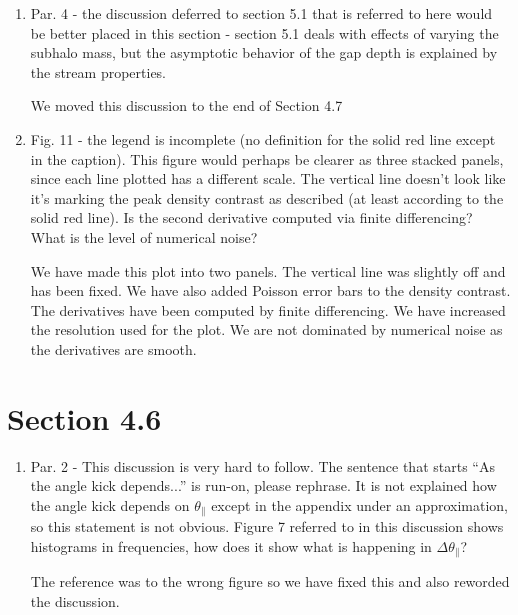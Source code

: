 \documentclass{article}
\begin{document}
\begin{enumerate}
\item Par. 4 - the discussion deferred to section 5.1 that is referred to here would be better
placed in this section - section 5.1 deals with effects of varying the subhalo mass, but
the asymptotic behavior of the gap depth is explained by the stream properties.

{\color{red} We moved this discussion to the end of Section 4.7}

\item Fig. 11 - the legend is incomplete (no definition for the solid red line except in the
caption). This figure would perhaps be clearer as three stacked panels, since each line
plotted has a different scale. The vertical line doesn’t look like it’s marking the peak
density contrast as described (at least according to the solid red line). Is the second
derivative computed via finite differencing? What is the level of numerical noise?

{\color{red} We have made this plot into two panels. The vertical line was slightly off and has been fixed. We have also added Poisson error bars to the density contrast. The derivatives have been computed by finite differencing. We have increased the resolution used for the plot. We are not dominated by numerical noise as the derivatives are smooth.}

\end{enumerate}

\section{Section 4.6}
\begin{enumerate}
\item Par. 2 - This discussion is very hard to follow. The sentence that starts “As the angle
kick depends...” is run-on, please rephrase. It is not explained how the angle kick
depends on $\theta_\parallel$ except in the appendix under an approximation, so this
statement is not obvious. Figure 7 referred to in this discussion shows histograms in
frequencies, how does it show what is happening in $\Delta \theta_\parallel$?

{\color{red} The reference was to the wrong figure so we have fixed this and also reworded the discussion.}

\end{enumerate}
\end{document}
